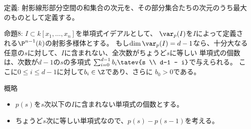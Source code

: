 \begin{framed}
  定義:
  射影線形部分空間の和集合の次元を、その部分集合たちの次元のうち最大のものとして定義する。
\end{framed}

\begin{framed}
  命題8:
  $I\subset k[x_1,\dots,x_n]$を単項式イデアルとして、
  $\var_p(I)$を$I$によって定義される$\P^{n-1}(k)$の射影多様体とする。
  もし$\dim \var_p(I) = d-1$なら、十分大なる
  任意の$s$に対して、$I$に含まれない、全次数がちょうど$s$に等しい
  単項式の個数は、次数が$d-1$の$s$の多項式
  $\sum_{i=0}^{d-1} b_i \tatev{s \\ d-1 - i}$で与えられる。
  ここに$0\le i \le d-1$に対して$b_i \in \Z$であり、さらに
  $b_0 > 0$である。
\end{framed}
\begin{myproof}
  概略
  \begin{itemize}
    \item $p(s)$を$s$次以下の$I$に含まれない単項式の個数とする。
    \item ちょうど$s$次に等しい単項式なので、$p(s) - p(s-1)$を考える。

\end{itemize}
\end{myproof}
